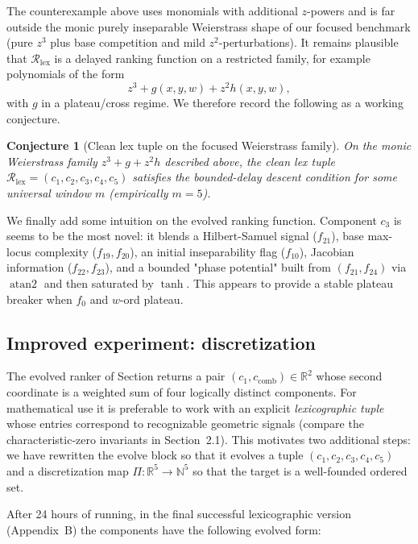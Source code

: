 \documentclass[11pt]{amsart}
\newtheorem{conjecture}{Conjecture}
\begin{document}
The counterexample above uses monomials with additional $z$-powers and is far outside the monic purely inseparable Weierstrass shape of our focused benchmark (pure $z^3$ plus base competition and mild $z^2$-perturbations).
It remains plausible that $\mathcal R_{\mathrm{lex}}$ is a delayed ranking function on a restricted family, for example polynomials of the form
\[
z^3 + g(x,y,w) + z^2 h(x,y,w),
\]
with $g$ in a plateau/cross regime.
We therefore record the following as a working conjecture.

\begin{conjecture}[Clean lex tuple on the focused Weierstrass family]
\label{conj:clean-lex-weierstrass}
On the monic Weierstrass family $z^3+g+z^2h$ described above, the clean lex tuple $\mathcal R_{\mathrm{lex}}=(c_1,c_2,c_3,c_4,c_5)$ satisfies the bounded-delay descent condition for some universal window $m$ (empirically $m=5$).
\end{conjecture}

We finally add some intuition on the evolved ranking function. Component $c_3$ is seems to be the most novel: it blends a Hilbert-Samuel signal ($f_{21}$), base max-locus complexity ($f_{19},f_{20}$),
an initial inseparability flag ($f_{10}$), Jacobian information ($f_{22},f_{23}$), and a bounded "phase potential" built from
$(f_{21},f_{24})$ via $\operatorname{atan2}$ and then saturated by $\tanh$.
This appears to provide a stable plateau breaker when $f_0$ and $w$-ord plateau.


\subsection{Improved experiment:  discretization}\label{subsec:discretize}

The evolved ranker of Section  returns a pair $(c_1,c_{\mathrm{comb}})\in \mathbb R^2$ whose
second coordinate is a weighted sum of four logically distinct components.
For mathematical use it is preferable to work with an explicit \emph{lexicographic tuple} whose
entries correspond to recognizable geometric signals (compare the characteristic-zero invariants
in Section~2.1).
This motivates two additional steps: we have rewritten the evolve block so that it evolves a  tuple $(c_1,c_2,c_3,c_4,c_5)$ and a discretization  map $\Pi: \mathbb{R}^5 \to \mathbb N^5$ so that the target is a well-founded ordered set.

After 24 hours of running, in the final successful lexicographic version (Appendix~B) the components have the following evolved form:
\end{document}

